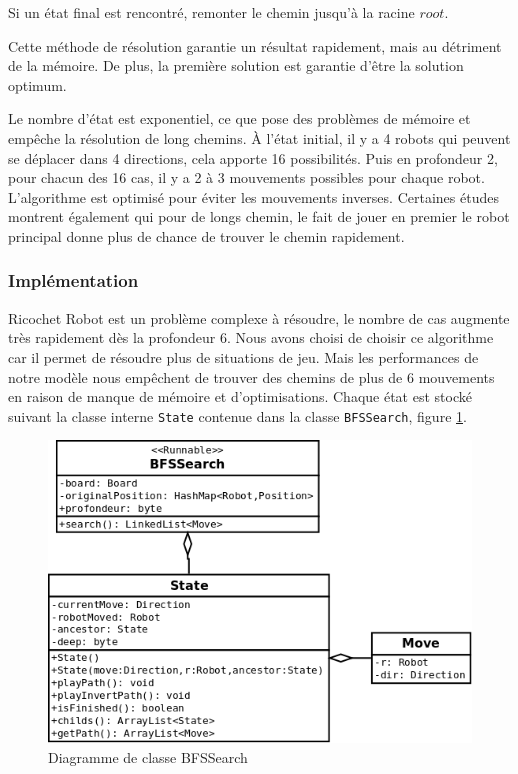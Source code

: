 \documentclass[a4paper]{article} %
\begin{document}
Si un état final est rencontré, remonter le chemin jusqu'à la racine $root$.

Cette méthode de résolution garantie un résultat rapidement, mais au détriment de la mémoire. De plus, la première solution est garantie d'être la solution optimum.

Le nombre d'état est exponentiel, ce que pose des problèmes de mémoire et empêche la résolution de long chemins. À l'état initial, il y a 4 robots qui peuvent se déplacer dans 4 directions, cela apporte 16 possibilités. Puis en profondeur 2, pour chacun des 16 cas, il y a 2 à 3 mouvements possibles pour chaque robot. L'algorithme est optimisé pour éviter les mouvements inverses. Certaines études montrent également qui pour de longs chemin, le fait de jouer en premier le robot principal donne plus de chance de trouver le chemin rapidement.

		\subsubsection{Implémentation}
Ricochet Robot est un problème complexe à résoudre, le nombre de cas augmente très rapidement dès la profondeur 6. Nous avons choisi de choisir ce algorithme car il permet de résoudre plus de situations de jeu. Mais les performances de notre modèle nous empêchent de trouver des chemins de plus de 6 mouvements en raison de manque de mémoire et d'optimisations. Chaque état est stocké suivant la classe interne \texttt{State} contenue dans la classe \texttt{BFSSearch}, figure \ref{bfs}.

\begin{figure}[htpb]
	\begin{center}
	\includegraphics[scale=0.3]{./images/bfssearch.png}
	\caption{Diagramme de classe BFSSearch}\label{bfs}
	\end{center}
\end{figure}
\end{document}

